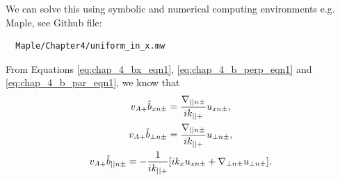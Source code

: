 We can solve this using symbolic and numerical computing environments e.g. Maple, see Github file:
\begin{verbatim}
  Maple/Chapter4/uniform_in_x.mw
\end{verbatim} 
From Equations \eqref{eq:chap_4_bx_eqn1}, \eqref{eq:chap_4_b_perp_eqn1} and \eqref{eq:chap_4_b_par_eqn1}, we know that
\begin{gather}
    \label{eq:bxn_pm_oblique_field_piecewise_constant_density}
    v_{A+}\hat{b}_{xn\pm} = \frac{\nabla_{||n\pm}}{ik_{||+}}u_{xn\pm}, \\
    \label{eq:b_perp_n_pm_oblique_field_piecewise_constant_density}
    v_{A+}\hat{b}_{\perp n\pm} = \frac{\nabla_{||n\pm}}{ik_{||+}}u_{\perp n\pm}, \\
    \label{eq:b_par_n_pm}
    v_{A+}\hat{b}_{|| n\pm} = -\frac{1}{ik_{||+}}\qty[ik_x u_{xn\pm}+\nabla_{\perp n\pm} u_{\perp n\pm}].
\end{gather}

